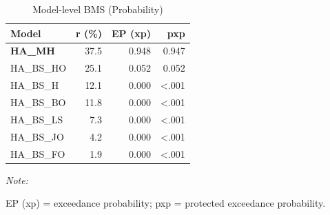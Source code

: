 \begin{table}[!h]
\centering
\caption{Model-level BMS (Probability)}
\centering
\begin{threeparttable}
\begin{tabular}[t]{lrrr}
\toprule
Model & r (\%) & EP (xp) & pxp\\
\midrule
\textbf{HA_MH} & 37.5 & 0.948 & 0.947\\
HA_BS_HO & 25.1 & 0.052 & 0.052\\
HA_BS_H & 12.1 & 0.000 & <.001\\
HA_BS_BO & 11.8 & 0.000 & <.001\\
HA_BS_LS & 7.3 & 0.000 & <.001\\
HA_BS_JO & 4.2 & 0.000 & <.001\\
HA_BS_FO & 1.9 & 0.000 & <.001\\
\bottomrule
\end{tabular}
\begin{tablenotes}
\item \textit{Note: } 
\item EP (xp) = exceedance probability; pxp = protected exceedance probability.
\end{tablenotes}
\end{threeparttable}
\end{table}
